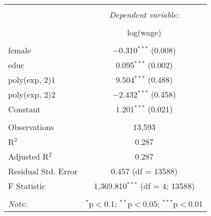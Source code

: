 
\begin{tabular}{@{\extracolsep{5pt}}lc} 
\\[-1.8ex]\hline 
\hline \\[-1.8ex] 
 & \multicolumn{1}{c}{\textit{Dependent variable:}} \\ 
\cline{2-2} 
\\[-1.8ex] & log(wage) \\ 
\hline \\[-1.8ex] 
 female & $-$0.310$^{***}$ (0.008) \\ 
  educ & 0.095$^{***}$ (0.002) \\ 
  poly(exp, 2)1 & 9.504$^{***}$ (0.488) \\ 
  poly(exp, 2)2 & $-$2.432$^{***}$ (0.458) \\ 
  Constant & 1.201$^{***}$ (0.021) \\ 
 \hline \\[-1.8ex] 
Observations & 13,593 \\ 
R$^{2}$ & 0.287 \\ 
Adjusted R$^{2}$ & 0.287 \\ 
Residual Std. Error & 0.457 (df = 13588) \\ 
F Statistic & 1,369.810$^{***}$ (df = 4; 13588) \\ 
\hline 
\hline \\[-1.8ex] 
\textit{Note:}  & \multicolumn{1}{r}{$^{*}$p$<$0.1; $^{**}$p$<$0.05; $^{***}$p$<$0.01} \\ 
\end{tabular} 
